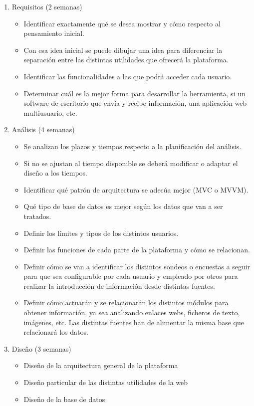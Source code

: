\begin{enumerate}
  
\item Requisitos (2 semanas)
  \begin{itemize}
  \item Identificar exactamente qué se desea mostrar y cómo respecto al pensamiento inicial.
  \item Con esa idea inicial se puede dibujar una idea para diferenciar la separación entre las distintas utilidades que ofrecerá la plataforma.
  \item Identificar las funcionalidades a las que podrá acceder cada usuario.
  \item Determinar cuál es la mejor forma para desarrollar la herramienta, si un software de escritorio que envía y recibe información, una aplicación web multiusuario, etc.
  \end{itemize}

\item Análisis (4 semanas)
  \begin{itemize}
  \item Se analizan los plazos y tiempos respecto a la planificación del análisis.
  \item Si no se ajustan al tiempo disponible se deberá modificar o adaptar el diseño a los tiempos.
  \item Identificar qué patrón de arquitectura se adec\'ua mejor (MVC o MVVM).
  \item Qué tipo de base de datos es mejor según los datos que van a ser tratados.
  \item Definir los límites y tipos de los distintos usuarios.
  \item Definir las funciones de cada parte de la plataforma y cómo se relacionan.
  \item Definir cómo se van a identificar los distintos sondeos o encuestas a seguir para que sea configurable por cada usuario y empleado por otros para realizar la introducción de información desde distintas fuentes.
 \item Definir cómo actuarán y se relacionarán los distintos módulos para obtener información, ya sea analizando enlaces webs, ficheros de texto, imágenes, etc. Las distintas fuentes han de alimentar la misma base que relacionará los datos.
  \end{itemize}


\item Diseño (3 semanas)
  \begin{itemize}
  \item Diseño de la arquitectura general de la plataforma
  \item Diseño particular de las distintas utilidades de la web
  \item Diseño de la base de datos
  \end{itemize}
  

\end{enumerate}
